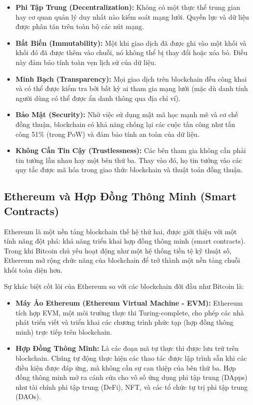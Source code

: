 \begin{itemize}
    \item \textbf{Phi Tập Trung (Decentralization):} Không có một thực thể trung gian hay cơ quan quản lý duy nhất nào kiểm soát mạng lưới. Quyền lực và dữ liệu được phân tán trên toàn bộ các nút mạng.
    
    \item \textbf{Bất Biến (Immutability):} Một khi giao dịch đã được ghi vào một khối và khối đó đã được thêm vào chuỗi, nó không thể bị thay đổi hoặc xóa bỏ. Điều này đảm bảo tính toàn vẹn lịch sử của dữ liệu.
    
    \item \textbf{Minh Bạch (Transparency):} Mọi giao dịch trên blockchain đều công khai và có thể được kiểm tra bởi bất kỳ ai tham gia mạng lưới (mặc dù danh tính người dùng có thể được ẩn danh thông qua địa chỉ ví).
    
    \item \textbf{Bảo Mật (Security):} Nhờ việc sử dụng mật mã học mạnh mẽ và cơ chế đồng thuận, blockchain có khả năng chống lại các cuộc tấn công như tấn công 51\% (trong PoW) và đảm bảo tính an toàn của dữ liệu.
    
    \item \textbf{Không Cần Tin Cậy (Trustlessness):} Các bên tham gia không cần phải tin tưởng lẫn nhau hay một bên thứ ba. Thay vào đó, họ tin tưởng vào các quy tắc được mã hóa trong giao thức blockchain và thuật toán đồng thuận.
\end{itemize}

\subsection{Ethereum và Hợp Đồng Thông Minh (Smart Contracts)}

Ethereum là một nền tảng blockchain thế hệ thứ hai, được giới thiệu với một tính năng đột phá: khả năng triển khai hợp đồng thông minh (smart contracts). Trong khi Bitcoin chủ yếu hoạt động như một hệ thống tiền tệ kỹ thuật số, Ethereum mở rộng chức năng của blockchain để trở thành một nền tảng chuỗi khối toàn diện hơn.

Sự khác biệt cốt lõi của Ethereum so với các blockchain đời đầu như Bitcoin là:

\begin{itemize}
    \item \textbf{Máy Ảo Ethereum (Ethereum Virtual Machine - EVM):} Ethereum tích hợp EVM, một môi trường thực thi Turing-complete, cho phép các nhà phát triển viết và triển khai các chương trình phức tạp (hợp đồng thông minh) trực tiếp trên blockchain.
    
    \item \textbf{Hợp Đồng Thông Minh:} Là các đoạn mã tự thực thi được lưu trữ trên blockchain. Chúng tự động thực hiện các thao tác được lập trình sẵn khi các điều kiện được đáp ứng, mà không cần sự can thiệp của bên thứ ba. Hợp đồng thông minh mở ra cánh cửa cho vô số ứng dụng phi tập trung (DApps) như tài chính phi tập trung (DeFi), NFT, và các tổ chức tự trị phi tập trung (DAOs).
\end{itemize}

